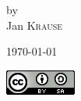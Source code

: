 \begin{titlepage}
\begin{center}



\vspace{3cm}


by\\
\vspace{1.0cm}
{\Large Jan \textsc{Krause}} 

\vfill

{\large \today}

\includegraphics{./images/CC-By-SA_88x31.png}

\end{center}

\end{titlepage}

